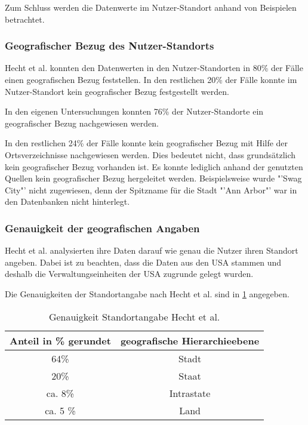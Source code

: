 			Zum Schluss werden die Datenwerte im Nutzer-Standort anhand von Beispielen betrachtet.


			\subsubsection{Geografischer Bezug des Nutzer-Standorts} 
				
				Hecht et al. konnten den Datenwerten in den Nutzer-Standorten in 80\% der Fälle einen geografischen Bezug feststellen.
				In den restlichen 20\% der Fälle konnte im Nutzer-Standort kein geografischer Bezug festgestellt werden. 

				In den eigenen Untersuchungen konnten 76\% der Nutzer-Standorte ein geografischer Bezug nachgewiesen werden. 

				In den restlichen 24\% der Fälle konnte kein geografischer Bezug mit Hilfe der Ortsverzeichnisse nachgewiesen werden. 
				Dies bedeutet nicht, dass grundsätzlich kein geografischer Bezug vorhanden ist. 
				Es konnte lediglich anhand der genutzten Quellen kein geografischer Bezug hergeleitet werden.
				Beispielsweise wurde "'Swag City"' nicht zugewiesen, denn der Spitzname für die Stadt "'Ann Arbor"' war in den Datenbanken nicht hinterlegt. 

				
			\subsubsection{Genauigkeit der geografischen Angaben}
				
				Hecht et al. analysierten ihre Daten darauf wie genau die Nutzer ihren Standort angeben.
				Dabei ist zu beachten, dass die Daten aus den USA stammen und deshalb die Verwaltungseinheiten der USA zugrunde gelegt wurden.
				
				Die Genauigkeiten der Standortangabe nach Hecht et al. sind in \ref{tab:genauigkeitenHecht} angegeben. 

				\begin{table}[htpb]
				\caption{Genauigkeit Standortangabe Hecht et al.} 
				\centering
				\begin{tabular}{|c||c|}
					\hline
					Anteil in \% gerundet & geografische Hierarchieebene \\
					\hline\hline
					64\% & Stadt \\
					\hline
					20\% & Staat \\
					\hline
					ca. 8\% & Intrastate \\
					\hline
					ca. 5 \% & Land \\
					\hline
				\end{tabular}
				\label{tab:genauigkeitenHecht} 
				\end{table} 

